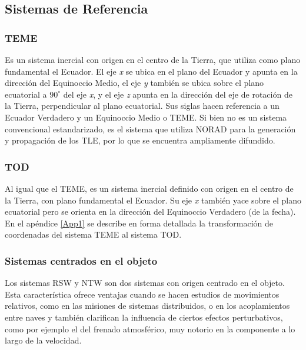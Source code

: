 {\subsection{Sistemas de Referencia}\label{subsec:sistRef}

\subsubsection*{TEME}
 Es un sistema inercial con origen en el centro de la Tierra, que utiliza como plano fundamental el Ecuador. El eje {\it{x}} se ubica en el plano del Ecuador y apunta en la direcci\'on del Equinoccio Medio, el eje {\it{y}} tambi\'en se ubica sobre el plano ecuatorial a $90^{\circ}$ del eje {\it{x}}, y el eje {\it{z}} apunta en la direcci\'on del eje de rotaci\'on de la Tierra, perpendicular al plano ecuatorial. Sus siglas hacen referencia a un Ecuador Verdadero y un Equinoccio Medio o \ac{TEME}. Si bien no es un sistema convencional estandarizado, es el sistema que utiliza NORAD para la generaci\'on y propagaci\'on de los TLE, por lo que se encuentra ampliamente difundido.
 
\subsubsection*{TOD}
 Al igual que el TEME, es un sistema inercial definido con origen en el centro de la Tierra, con plano fundamental el Ecuador. Su eje {\it{x}} tambi\'en yace sobre el plano ecuatorial pero se orienta en la direcci\'on del Equinoccio Verdadero (de la fecha).\\
 En el ap\'endice \ref{App1} se describe en forma detallada la transformaci\'on de coordenadas del sistema TEME al sistema TOD.
 
\subsubsection*{Sistemas centrados en el objeto}
Los sistemas RSW y NTW son dos sistemas con origen centrado en el objeto. Esta caracter\'istica ofrece ventajas cuando se hacen estudios de movimientos relativos, como en las misiones de sistemas distribuidos, o en los acoplamientos entre naves y tambi\'en clarifican la influencia de ciertos efectos perturbativos, como por ejemplo el del frenado atmosf\'erico, muy notorio en la componente a lo largo de la velocidad.\\

}
